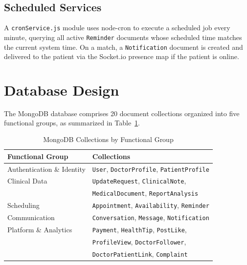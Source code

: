 \subsection{Scheduled Services}

A \texttt{cronService.js} module uses node-cron to execute a scheduled job every minute, querying all active \texttt{Reminder} documents whose scheduled time matches the current system time. On a match, a \texttt{Notification} document is created and delivered to the patient via the Socket.io presence map if the patient is online.

\section{Database Design}

The MongoDB database comprises 20 document collections organized into five functional groups, as summarized in Table~\ref{tab:collections}.

\begin{table}[h]
\caption{MongoDB Collections by Functional Group}
\label{tab:collections}
\centering
\renewcommand{\arraystretch}{1.15}
\begin{tabular}{|l|l|}
\hline
\textbf{Functional Group} & \textbf{Collections} \\
\hline
Authentication \& Identity & \texttt{User}, \texttt{DoctorProfile}, \texttt{PatientProfile} \\
\hline
Clinical Data & \texttt{UpdateRequest}, \texttt{ClinicalNote}, \\
              & \texttt{MedicalDocument}, \texttt{ReportAnalysis} \\
\hline
Scheduling & \texttt{Appointment}, \texttt{Availability}, \texttt{Reminder} \\
\hline
Communication & \texttt{Conversation}, \texttt{Message}, \texttt{Notification} \\
\hline
Platform \& Analytics & \texttt{Payment}, \texttt{HealthTip}, \texttt{PostLike}, \\
                      & \texttt{ProfileView}, \texttt{DoctorFollower}, \\
                      & \texttt{DoctorPatientLink}, \texttt{Complaint} \\
\hline
\end{tabular}
\end{table}

